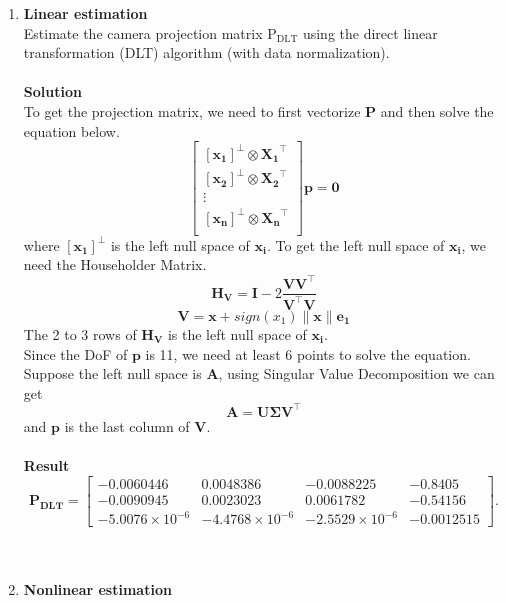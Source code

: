 \documentclass{../../assignment}
\date{\today}
\begin{document}
\begin{problemlist}


\begin{enumerate}
\item \textbf{Linear estimation}\\
Estimate the camera projection matrix $\mathrm{P_{DLT}}$ using the direct linear transformation (DLT) algorithm (with data normalization).
\\\\
\textbf{Solution}\\
To get the projection matrix, we need to first vectorize $\mathbf{P}$ and then solve the equation below.
\[
\begin{bmatrix}
[\mathbf{x_1}]^{\bot} \otimes \mathbf{X_1}^{\top}\\
[\mathbf{x_2}]^{\bot} \otimes \mathbf{X_2}^{\top}\\
\vdots \\
[\mathbf{x_n}]^{\bot} \otimes \mathbf{X_n}^{\top}\\
\end{bmatrix}\mathbf{p}=\mathbf{0}
\]
where $[\mathbf{x_1}]^{\bot}$ is the left null space of $\mathbf{x_i}$.
To get the left null space of $\mathbf{x_i}$, we need the Householder Matrix.
$$\mathbf{H_V} = \mathbf{I} - 2\frac{\mathbf{V V^{\top}}}{\mathbf{V^{\top} V}}$$
$$\mathbf{V} = \mathbf{x} + sign(x_1)\|\mathbf{x}\|\mathbf{e_1}$$
The 2 to 3 rows of $\mathbf{H_V}$ is the left null space of $\mathbf{x_i}$.\\
Since the DoF of $\mathbf{p}$ is 11, we need at least 6 points to solve the equation. Suppose the left null space is $\mathbf{A}$, using Singular Value Decomposition we can get
$$\mathbf{A} = \mathbf{U}\mathbf{\Sigma}\mathbf{V}^{\top}$$
and $\mathbf{p}$ is the last column of $\mathbf{V}$.
\\\\
\textbf{Result}\\
\[
\mathbf{P_{DLT}} = 
\begin{bmatrix}
-0.0060446 & 0.0048386 & -0.0088225 & -0.8405\\
-0.0090945 & 0.0023023 &  0.0061782 & -0.54156\\
-5.0076\times 10^{-6} & -4.4768\times 10^{-6} &  -2.5529\times 10^{-6}& -0.0012515
\end{bmatrix}.
\]
\\\\
\item {\bfseries Nonlinear estimation}\\

\end{enumerate}
\end{problemlist}
\end{document}

